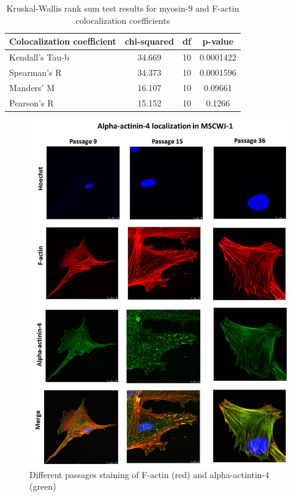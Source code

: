\documentclass[english,authoryear]{elsarticle}
\begin{document}
\begin{table} [ht]
  \caption{Kruskal-Wallis rank sum test results for myosin-9 and F-actin colocalization coefficients}
  \label{tab:M9colocs}
\centering
\begin{tabular}{l|ccc}
    \hline
 Colocalization coefficient & chi-squared & df & p-value  \\
   \hline
 Kendall's Tau-b & 34.669 & 10 & 0.0001422 \\
 Spearman's R & 34.373 & 10 &  0.0001596 \\
 Manders' M & 16.107 & 10 & 0.09661 \\
 Pearson's R & 15.152 & 10 & 0.1266
\end{tabular}
\end{table}



\begin{figure}[hbt!]
\centering
\includegraphics[width=0.9\linewidth]{fig_a4-actin.jpg}
\caption{Different passages staining of F-actin (red) and alpha-actintin-4 (green)}
\label{a4-actin}
\end{figure}
\end{document}
